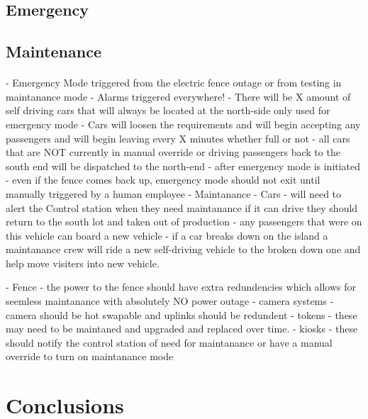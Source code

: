\documentclass[12pt]{article}
\begin{document}
	\paragraph{}

	\subsection{Emergency}
	\paragraph{}
	
	\subsection{Maintenance}
	\paragraph{}
	- Emergency Mode triggered from the electric fence outage or from testing in maintanance mode
        - Alarms triggered everywhere!
        - There will be X amount of self driving cars that will always be located at the north-side only used for emergency mode
        - Cars will loosen the requirements and will begin accepting  any passengers and will begin leaving every X minutes whether full or not
        - all cars that are NOT currently in manual override or driving passengers back to the south end will be dispatched to the north-end
        - after emergency mode is initiated - even if the fence comes back up, emergency mode should not exit until manually triggered by a human employee
    - Maintanance
        - Cars 
            - will need to alert the Control station when they need maintanance if it can drive they should return to the south lot and taken out of production
            - any passengers that were on this vehicle can board a new vehicle
            - if a car breaks down on the island a maintanance crew will ride a new self-driving vehicle to the broken down one and help move visiters into new vehicle.
            
        - Fence
            - the power to the fence should have extra redundencies which allows for seemless maintanance with absolutely NO power outage
        - camera systems
            - camera should be hot swapable and uplinks should be redundent
        - tokens 
            - these may need to be maintaned and upgraded and replaced over time.
        - kiosks
            - these should notify the control station of need for maintanance or have a manual override to turn on maintanance mode
	\paragraph{}
	
\section{Conclusions}
\paragraph{}
\paragraph{}
\paragraph{}


\end{document}
